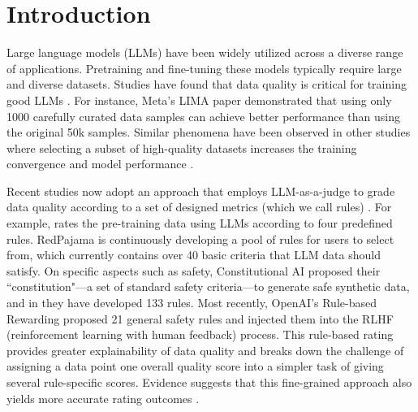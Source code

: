 \documentclass{article}
\begin{document}
\section{Introduction}\label{sec:Introduction}
Large language models (LLMs) have been widely utilized across a diverse range of applications. Pretraining and fine-tuning these models typically require large and diverse datasets. Studies have found that data quality is critical for training good LLMs \citep{brown2020language, chowdhery2023palm, du2022glam, dubey2024llama, wenzek2019ccnet}. For instance, Meta’s LIMA paper \citep{zhou2024lima} demonstrated that using only 1000 carefully curated data samples can achieve better performance than using the original 50k samples. Similar phenomena have been observed in other studies where selecting a subset of high-quality datasets increases the training convergence and model performance \citep{cao2023instruction, hsieh2023distilling, xie2024data, sachdeva2024train, zhang2023opt, javaheripi2023phi}. 

Recent studies now adopt an approach that employs LLM-as-a-judge to grade data quality according to a set of designed metrics (which we call rules) \citep{yuan2024self, wettig2024qurating, bai2022constitutional, murule}. For example, \citet{wettig2024qurating} rates the pre-training data using LLMs according to four predefined rules. RedPajama \citep{RedPajama2023} is continuously developing a pool of rules for users to select from, which currently contains over 40 basic criteria that LLM data should satisfy.  On specific aspects such as safety, Constitutional AI \citep{bai2022constitutional} proposed their ``constitution"---a set of standard safety criteria---to generate safe synthetic data, and in \cite{huang2024collective} they have developed 133 rules. Most recently, OpenAI's Rule-based Rewarding \citep{murule} proposed 21 general safety rules and injected them into the RLHF (reinforcement learning with human feedback) process. This rule-based rating provides greater explainability of data quality and breaks down the challenge of assigning a data point one overall quality score into a simpler task of giving several rule-specific scores. Evidence suggests that this fine-grained approach also yields more accurate rating outcomes \citep{yuan2024self, wettig2024qurating, bai2022constitutional, murule}.
\end{document}
